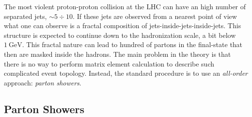 %
%

The most violent proton-proton collision at the LHC can have an high number of separated jets, $\sim 5\div 10$. If these jets are observed from a nearest point of view what one can observe is a fractal composition of jets-inside-jets-inside-jets. This structure is expected to continue down to the hadronization scale, a bit below $1\ \mathrm{GeV}$. This fractal nature can lead to hundred of partons in the final-state that then are masked inside the hadrons.
The main problem in the theory is that there is no way to perform matrix element calculation to describe such complicated event topology. Instead, the standard procedure is to use an \textit{all-order} approach: \textit{parton showers}.  




\subsection{Parton Showers}
 
 
